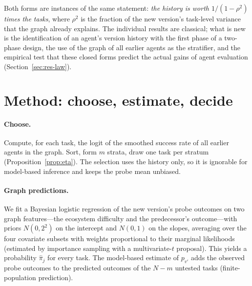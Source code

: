 \documentclass[11pt]{article}
\begin{document}
Both forms are instances of the same statement: \emph{the history is worth $1/(1-\rho^2)$ times the tasks}, where
$\rho^2$ is the fraction of the new version's task-level variance that the graph already explains. The individual
results are classical; what is new is the identification of an agent's version history with the first phase of a
two-phase design, the use of the graph of all earlier agents as the stratifier, and the empirical test that these
closed forms predict the actual gains of agent evaluation (Section~\ref{sec:res-law}).

\section{Method: choose, estimate, decide}
\label{sec:method}
\paragraph{Choose.} Compute, for each task, the logit of the smoothed success rate of all earlier agents in the
graph. Sort, form $m$ strata, draw one task per stratum (Proposition~\ref{prop:eta}). The selection uses the
history only, so it is ignorable for model-based inference and keeps the probe mean unbiased.

\paragraph{Graph predictions.} We fit a Bayesian logistic regression of the new version's probe outcomes on two
graph features---the ecosystem difficulty and the predecessor's outcome---with priors $N(0,2^2)$ on the intercept
and $N(0,1)$ on the slopes, averaging over the four covariate subsets with weights proportional to their marginal
likelihoods (estimated by importance sampling with a multivariate-$t$ proposal). This yields a probability
$\hat\pi_j$ for every task. The model-based estimate of $p_{v'}$ adds the observed probe outcomes to the predicted
outcomes of the $N-m$ untested tasks (finite-population prediction).
\end{document}
